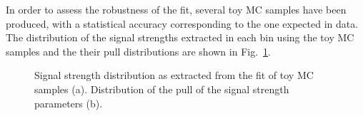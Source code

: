 In order to assess the robustness of the fit, several toy MC samples have been produced, with a statistical accuracy corresponding to the one expected in data. The distribution of the signal strengths extracted in each bin using the toy MC samples and the their pull distributions are shown in Fig.~\ref{fig:pull_fit}. 
\begin{figure}[htb]
\centering
{}
\caption{Signal strength distribution as extracted from the fit of toy MC samples (a). Distribution of the pull of the signal strength parameters (b).\label{fig:pull_fit}}
\end{figure}


